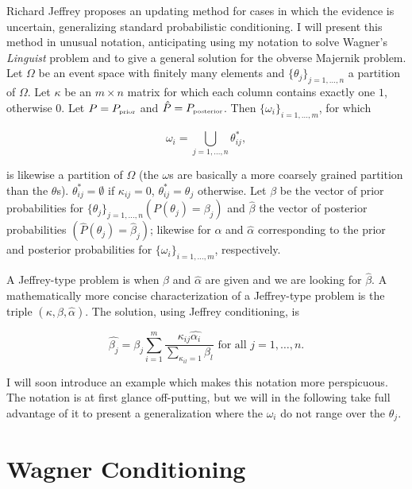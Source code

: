 \documentclass[entropy,article,submit,oneauthor,pdftex,12pt,a4paper]{mdpi}
\begin{document}
Richard Jeffrey proposes an updating method for cases in which the
evidence is uncertain, generalizing standard probabilistic
conditioning. I will present this method in unusual notation,
anticipating using my notation to solve Wagner's \emph{Linguist}
problem and to give a general solution for the obverse Majernik
problem. Let $\Omega$ be an event space with finitely many elements
and $\{\theta_{j}\}_{j=1,\ldots,n}$ a partition of $\Omega$. Let
$\kappa$ be an $m\times{}n$ matrix for which each column contains
exactly one $1$, otherwise $0$. Let $P=P_{\mbox{\tiny{prior}}}$ and
$\hat{P}=P_{\mbox{\tiny{posterior}}}$. Then
$\{\omega_{i}\}_{i=1,\ldots,m}$, for which

\begin{equation}
  \label{eq:m1}
  \omega_{i}=\bigcup_{j=1,\dots,n}\theta^{*}_{ij},
\end{equation}

is likewise a partition of $\Omega$ (the $\omega$s are basically a
more coarsely grained partition than the $\theta$s).
$\theta^{*}_{ij}=\emptyset$ if $\kappa_{ij}=0$,
$\theta^{*}_{ij}=\theta_{j}$ otherwise. Let $\beta$ be the vector of
prior probabilities for $\{\theta_{j}\}_{j=1,\ldots,n}
(P(\theta_{j})=\beta_{j})$ and $\hat{\beta}$ the vector of posterior
probabilities $(\hat{P}(\theta_{j})=\hat{\beta}_{j})$; likewise for
$\alpha$ and $\hat{\alpha}$ corresponding to the prior and posterior
probabilities for $\{\omega_{i}\}_{i=1,\ldots,m}$, respectively.

A Jeffrey-type problem is when $\beta$ and $\hat{\alpha}$ are given
and we are looking for $\hat{\beta}$. A mathematically more concise
characterization of a Jeffrey-type problem is the triple
$(\kappa,\beta,\hat{\alpha})$. The solution, using Jeffrey
conditioning, is

\begin{equation}
  \label{eq:m2}
  \hat{\beta_{j}}=\beta_{j}\sum_{i=1}^{m}\frac{\kappa_{ij}\hat{\alpha_{i}}}{\sum_{\kappa_{il}=1}\beta_{l}}\mbox{ for all }j=1,\ldots,n.
\end{equation}

I will soon introduce an example which makes this notation more
perspicuous. The notation is at first glance off-putting, but we will
in the following take full advantage of it to present a generalization
where the $\omega_{i}$ do not range over the $\theta_{j}$.

\section{Wagner Conditioning}
\label{wc}
\end{document}

